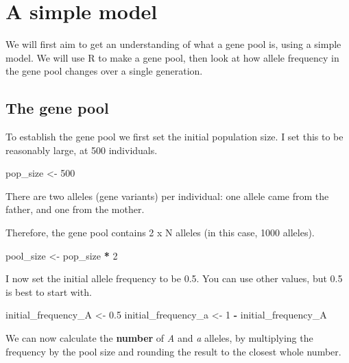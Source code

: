 \documentclass[
  a4paper]{book}
\newenvironment{Shaded}{\begin{snugshade}}{\end{snugshade}}
\newcommand{\DecValTok}[1]{\textcolor[rgb]{0.00,0.00,0.81}{#1}}
\newcommand{\FloatTok}[1]{\textcolor[rgb]{0.00,0.00,0.81}{#1}}
\newcommand{\NormalTok}[1]{#1}
\newcommand{\OtherTok}[1]{\textcolor[rgb]{0.56,0.35,0.01}{#1}}
\newcommand{\SpecialCharTok}[1]{\textcolor[rgb]{0.81,0.36,0.00}{\textbf{#1}}}
\begin{document}
\section{A simple model}\label{a-simple-model}

We will first aim to get an understanding of what a gene pool is, using a simple model. We will use R to make a gene pool, then look at how allele frequency in the gene pool changes over a single generation.

\subsection{The gene pool}\label{the-gene-pool}

To establish the gene pool we first set the initial population size. I set this to be reasonably large, at 500 individuals.

\begin{Shaded}
\begin{Highlighting}[]
\NormalTok{pop\_size }\OtherTok{\textless{}{-}} \DecValTok{500}
\end{Highlighting}
\end{Shaded}

There are two alleles (gene variants) per individual: one allele came from the father, and one from the mother.

Therefore, the gene pool contains 2 x N alleles (in this case, 1000 alleles).

\begin{Shaded}
\begin{Highlighting}[]
\NormalTok{pool\_size }\OtherTok{\textless{}{-}}\NormalTok{ pop\_size }\SpecialCharTok{*} \DecValTok{2}
\end{Highlighting}
\end{Shaded}

I now set the initial allele frequency to be 0.5. You can use other values, but 0.5 is best to start with.

\begin{Shaded}
\begin{Highlighting}[]
\NormalTok{initial\_frequency\_A }\OtherTok{\textless{}{-}} \FloatTok{0.5}
\NormalTok{initial\_frequency\_a }\OtherTok{\textless{}{-}} \DecValTok{1} \SpecialCharTok{{-}}\NormalTok{ initial\_frequency\_A}
\end{Highlighting}
\end{Shaded}

We can now calculate the \textbf{number} of \emph{A} and \emph{a} alleles, by multiplying the frequency by the pool size and rounding the result to the closest whole number.
\end{document}
